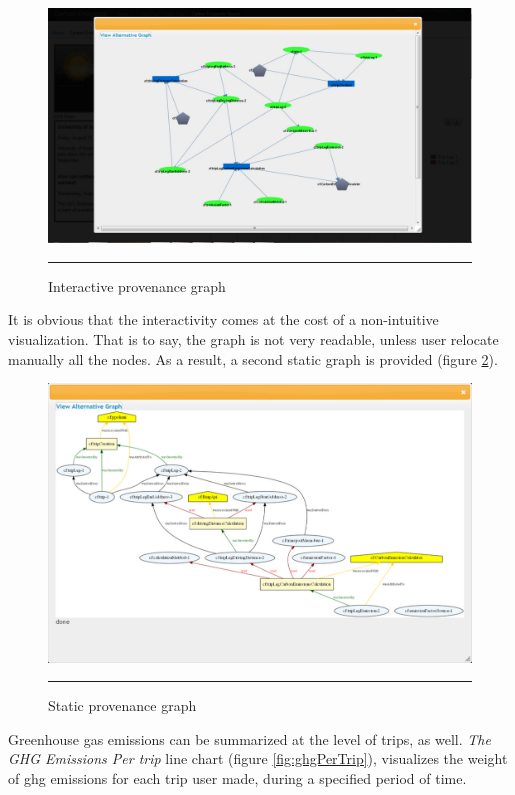 \begin{figure}[htbp]
	\centering
		\includegraphics[scale=0.40]{./Figures/chapter4/figure18.pdf}
		\rule{35em}{0.5pt}
	\caption[Interactive provenance graph]{Interactive provenance graph}
	\label{fig:provGraph}
\end{figure}

It is obvious that the interactivity comes at the cost of a non-intuitive visualization. That is to say, the graph is not very readable, unless user relocate manually all the nodes. As a result, a second static graph is provided (figure \ref{fig:provStaticGraph}).

\begin{figure}[htbp]
	\centering
		\includegraphics[scale=0.50]{./Figures/chapter4/figure19.pdf}
		\rule{35em}{0.5pt}
	\caption[Static provenance graph]{Static provenance graph}
	\label{fig:provStaticGraph}
\end{figure}

Greenhouse gas emissions can be summarized at the level of trips, as well. \emph{The GHG Emissions Per trip} line chart (figure \ref{fig:ghgPerTrip}), visualizes the weight of ghg emissions for each trip user made, during a specified period of time.

